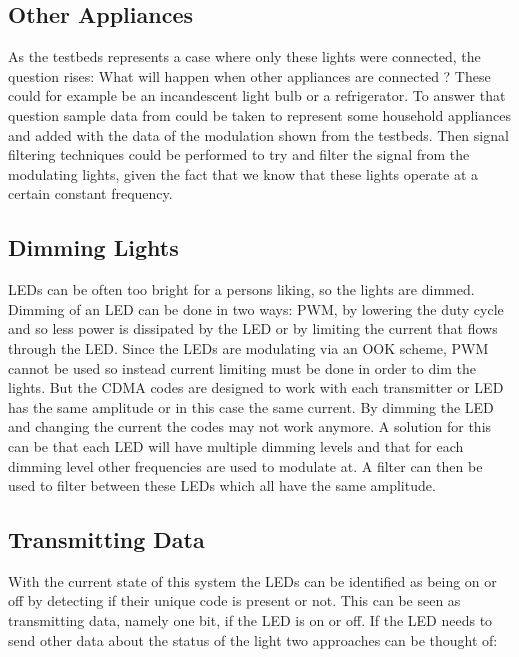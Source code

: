 	\subsection{Other Appliances}

	As the testbeds represents a case where only these lights were connected, the question rises: What will happen when other appliances are connected ?
	These could for example be an incandescent light bulb or a refrigerator.
	To answer that question sample data from \cite{kolter2011redd} could be taken to represent some household appliances and added with the data of the modulation shown from the testbeds.
	Then signal filtering techniques could be performed to try and filter the signal from the modulating lights, given the fact that we know that these lights operate at a certain constant frequency.


	\subsection{Dimming Lights}

	LEDs can be often too bright for a persons liking, so the lights are dimmed.
	Dimming of an LED can be done in two ways: PWM, by lowering the duty cycle and so less power is dissipated by the LED or by limiting the current that flows through the LED.
	Since the LEDs are modulating via an OOK scheme, PWM cannot be used so instead current limiting must be done in order to dim the lights.
	But the CDMA codes are designed to work with each transmitter or LED has the same amplitude or in this case the same current.
	By dimming the LED and changing the current the codes may not work anymore.
	A solution for this can be that each LED will have multiple dimming levels and that for each dimming level other frequencies are used to modulate at.
	A filter can then be used to filter between these LEDs which all have the same amplitude.



	\subsection{Transmitting Data}

	With the current state of this system the LEDs can be identified as being on or off by detecting if their unique code is present or not.
	This can be seen as transmitting data, namely one bit, if the LED is on or off.
	If the LED needs to send other data about the status of the light two approaches can be thought of: 


